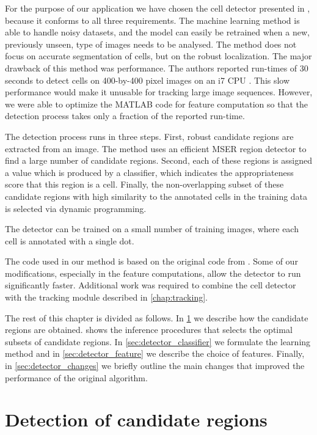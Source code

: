	For the purpose of our application we have chosen the cell detector presented in \cite{arteta12}, because it conforms to all three requirements. The machine learning method is able to handle noisy datasets, and the model can easily be retrained when a new, previously unseen, type of images needs to be analysed. The method does not focus on accurate segmentation of cells, but on the robust localization. The major drawback of this method was performance. The authors reported run-times of 30 seconds to detect cells on 400-by-400 pixel images on an i7 CPU . This slow performance would make it unusable for tracking large image sequences. However, we were able to optimize the MATLAB code for feature computation so that the detection process takes only a fraction of the reported run-time.
	
	The detection process runs in three steps. First, robust candidate regions are extracted from an image. The method uses an efficient MSER region detector \cite{matas04} to find a large number of candidate regions. Second, each of these regions is assigned a value which is produced by a classifier, which indicates the appropriateness score that this region is a cell. Finally, the non-overlapping subset of these candidate regions with high similarity to the annotated cells in the training data is selected via dynamic programming.
	
	The detector can be trained on a small number of training images, where each cell is  annotated with a single dot. 

	The code used in our method is based on the original code from \cite{arteta12}. Some of our modifications, especially in the feature computations, allow the detector to run significantly faster. Additional work was required to combine the cell detector with the tracking module described in \cref{chap:tracking}.
	
	The rest of this chapter is divided as follows. In \cref{sec:detector_extremal} we describe how the candidate regions are obtained.  shows the inference procedures that selects the optimal subsets of candidate regions. In \cref{sec:detector_classifier} we formulate the learning method and in \cref{sec:detector_feature} we describe the choice of features. Finally, in \cref{sec:detector_changes} we briefly outline the main changes that improved the performance of the original algorithm.
	
	\section{Detection of candidate regions \statusfirstdraft}
	\label{sec:detector_extremal}
	
